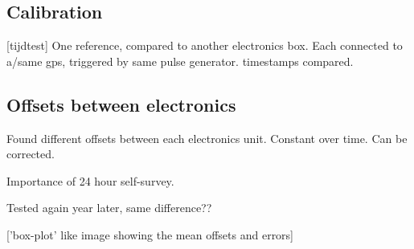%    


\subsection{Calibration}
\label{sub:gps_calibration}

[tijdtest]
One reference, compared to another \hisparc electronics box.
Each connected to a/same gps, triggered by same pulse generator.
\gps timestamps compared.


\subsection{Offsets between \hisparc electronics}
\label{sub:gps_offsets}

Found different offsets between each \hisparc electronics unit.
Constant over time. Can be corrected.

Importance of 24 hour self-survey.

Tested again year later, same difference??

['box-plot' like image showing the mean offsets and errors]
